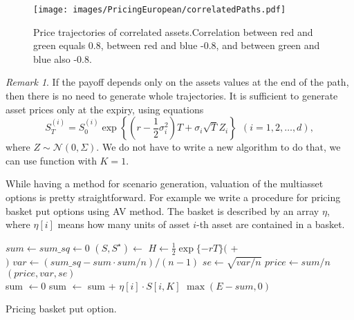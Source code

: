 \documentclass[a4paper,11pt, twoside]{book}
\theoremstyle{definition}
\theoremstyle{remark}
\newtheorem{remark}{Remark}[chapter]
\begin{document}
\begin{figure}
\centering
 \texttt{[image: images/PricingEuropean/correlatedPaths.pdf]}
\caption{Price trajectories of correlated assets.Correlation between red and green equals 0.8, between red and blue -0.8, and between green and blue also -0.8.}
\label{fig:corrPaths}
\end{figure}

\begin{remark}
 If the payoff depends only on the assets values at the end of the path, then there is no need to generate whole trajectories. It is sufficient to generate asset prices only at the expiry, using equations
 \[ S^{(i)}_T = S^{(i)}_0 \exp\left\{ (r - \frac{1}{2}\sigma_i^2)T + \sigma_i \sqrt{T} Z_i \right\} \ \ (i = 1,2,\ldots,d),\]
  where  $Z \sim \mathcal{N}(0, \Sigma)$. We do not have to write a new algorithm to do that, we can use function 
 with $K=1$.

\end{remark}

While having a method for scenario generation, valuation of the multiasset options is pretty straightforward. For example we write a procedure for pricing basket put options using AV method. The basket is described by an array $\eta$, where $\eta[i]$ means how many units of asset $i$-th asset are contained in a basket.

\begin{algorithm}
 \begin{algorithmic}[1]
  \State  $sum \gets sum\_sq \gets 0$
    \State $(S, S^\star) \gets$ 
    \State $H \gets \frac{1}{2}\exp\{-rT\} ($  +\\ 
    \hspace{132pt}  $)$
  \EndFor
  \State $var \gets (sum\_sq - sum \cdot sum/n) / (n-1)$
  \State $se \gets \sqrt{var / n}$
  \State $price \gets sum / n$
  \State \Return $(price, var, se)$
  \EndFunction
  \\
    \State sum $\gets 0$
      \State sum $\gets$ sum + $\eta[i]\cdot S[i, K]$
    \EndFor
    \State \Return $\max(E - sum, 0)$
  \EndFunction
 \end{algorithmic}
 \caption{Pricing basket put option.}
 \label{alg:priceBasketPutAV}
\end{algorithm}
\end{document}
